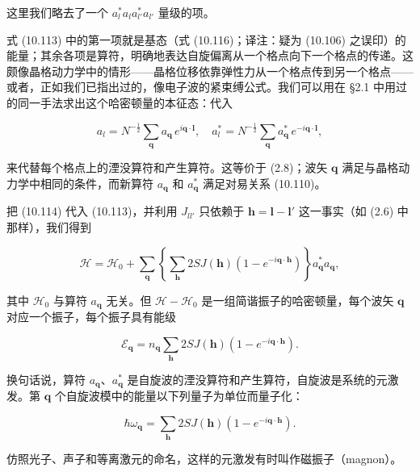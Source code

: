 这里我们略去了一个 $a_l^{*}a_l a_{l'}^{*}a_{l'}$ 量级的项。

式 (10.113) 中的第一项就是基态（式 (10.116)；译注：疑为 (10.106) 之误印）的能量；其余各项是算符，明确地表达自旋偏离从一个格点向下一个格点的传递。这颇像晶格动力学中的情形——晶格位移依靠弹性力从一个格点传到另一个格点——或者，正如我们已指出过的，像电子波的紧束缚公式。我们可以用在 §2.1 中用过的同一手法求出这个哈密顿量的本征态：代入

\begin{equation*}
a_l = N^{-\frac{1}{2}}\sum_{\mathbf{q}} a_{\mathbf{q}}\,e^{i\mathbf{q}\cdot\mathbf{l}}, \quad a_l^{*} = N^{-\frac{1}{2}}\sum_{\mathbf{q}} a_{\mathbf{q}}^{*}\,e^{-i\mathbf{q}\cdot\mathbf{l}},
\tag{10.114}
\end{equation*}

来代替每个格点上的湮没算符和产生算符。这等价于 (2.8)；波矢 $\mathbf{q}$ 满足与晶格动力学中相同的条件，而新算符 $a_{\mathbf{q}}$ 和 $a_{\mathbf{q}}^{*}$ 满足对易关系 (10.110)。

把 (10.114) 代入 (10.113)，并利用 $J_{ll'}$ 只依赖于 $\mathbf{h} = \mathbf{l}-\mathbf{l}'$ 这一事实（如 (2.6) 中那样），我们得到

\begin{equation*}
\mathcal{H} = \mathcal{H}_0 + \sum_{\mathbf{q}}\left\{\sum_{\mathbf{h}} 2SJ(\mathbf{h})\left(1-e^{-i\mathbf{q}\cdot\mathbf{h}}\right)\right\}a_{\mathbf{q}}^{*}a_{\mathbf{q}},
\tag{10.115}
\end{equation*}

其中 $\mathcal{H}_0$ 与算符 $a_{\mathbf{q}}$ 无关。但 $\mathcal{H}-\mathcal{H}_0$ 是一组简谐振子的哈密顿量，每个波矢 $\mathbf{q}$ 对应一个振子，每个振子具有能级

\begin{equation*}
\mathcal{E}_{\mathbf{q}} = n_{\mathbf{q}}\sum_{\mathbf{h}} 2SJ(\mathbf{h})\left(1-e^{-i\mathbf{q}\cdot\mathbf{h}}\right).
\tag{10.116}
\end{equation*}

换句话说，算符 $a_{\mathbf{q}}$、$a_{\mathbf{q}}^{*}$ 是自旋波的湮没算符和产生算符，自旋波是系统的元激发。第 $\mathbf{q}$ 个自旋波模中的能量以下列量子为单位而量子化：

\begin{equation*}
\hbar\omega_{\mathbf{q}} = \sum_{\mathbf{h}} 2SJ(\mathbf{h})\left(1-e^{-i\mathbf{q}\cdot\mathbf{h}}\right).
\tag{10.117}
\end{equation*}

仿照光子、声子和等离激元的命名，这样的元激发有时叫作磁振子（magnon）。

